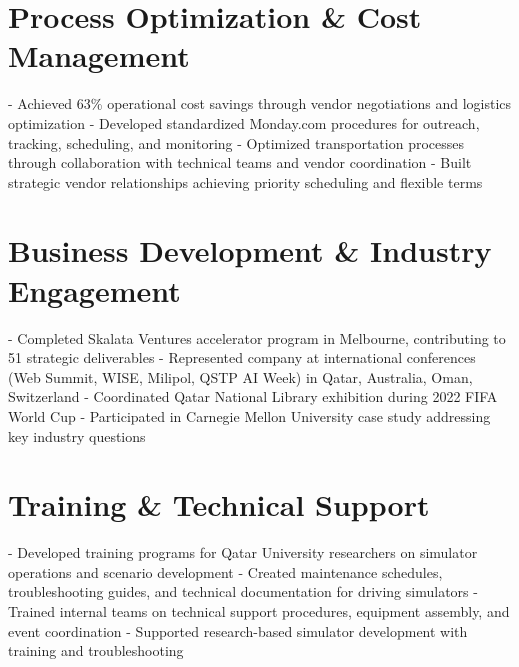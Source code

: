 \documentclass[a4paper,12pt]{article}
\begin{document}
\section{Process Optimization \& Cost Management}
- Achieved 63\% operational cost savings through vendor negotiations and logistics optimization  
- Developed standardized Monday.com procedures for outreach, tracking, scheduling, and monitoring  
- Optimized transportation processes through collaboration with technical teams and vendor coordination  
- Built strategic vendor relationships achieving priority scheduling and flexible terms  

\section{Business Development \& Industry Engagement}
- Completed Skalata Ventures accelerator program in Melbourne, contributing to 51 strategic deliverables  
- Represented company at international conferences (Web Summit, WISE, Milipol, QSTP AI Week) in Qatar, Australia, Oman, Switzerland  
- Coordinated Qatar National Library exhibition during 2022 FIFA World Cup  
- Participated in Carnegie Mellon University case study addressing key industry questions  

\section{Training \& Technical Support}
- Developed training programs for Qatar University researchers on simulator operations and scenario development  
- Created maintenance schedules, troubleshooting guides, and technical documentation for driving simulators  
- Trained internal teams on technical support procedures, equipment assembly, and event coordination  
- Supported research-based simulator development with training and troubleshooting  

\end{document}
